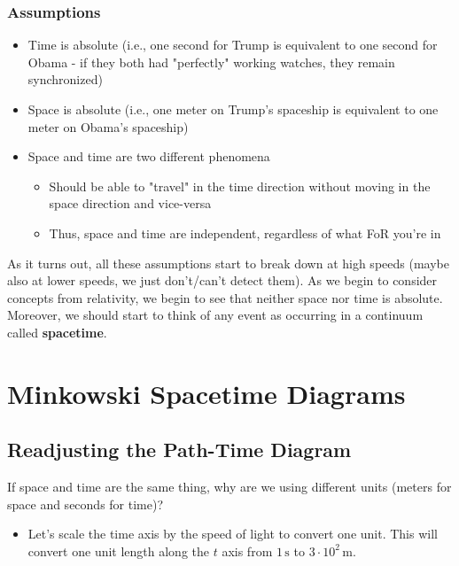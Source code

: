 \documentclass[a4paper]{article}
\begin{document}
		\subsubsection*{Assumptions}
		\begin{itemize}
			\item Time is absolute (i.e., one second for Trump is equivalent to one second for Obama - if they both had "perfectly" working watches, they remain synchronized)
			\item Space is absolute (i.e., one meter on Trump's spaceship is equivalent to one meter on Obama's spaceship)
			\item Space and time are two different phenomena 
			\begin{itemize}
				\item Should be able to "travel" in the time direction without moving in the space direction and vice-versa
				\item Thus, space and time are independent, regardless of what FoR you're in
			\end{itemize}
		\end{itemize}
	As it turns out, all these assumptions start to break down at high speeds (maybe also at lower speeds, we just don't/can't detect them). As we begin to consider concepts from relativity, we begin to see that neither space nor time is absolute.  Moreover, we should start to think of any event as occurring in a continuum called \textbf{spacetime}. 
\section*{Minkowski Spacetime Diagrams}
	\subsection*{Readjusting the Path-Time Diagram}
	If space and time are the same thing, why are we using different units (meters for space and seconds for time)?
		\begin{itemize}
			\item Let's scale the time axis by the speed of light to convert one unit. This will convert one unit length along the $t$ axis from $1 \, \mathrm{s}$ to $3 \cdot 10^2 \, \mathrm{m}$.
		\end{itemize}
\end{document}

